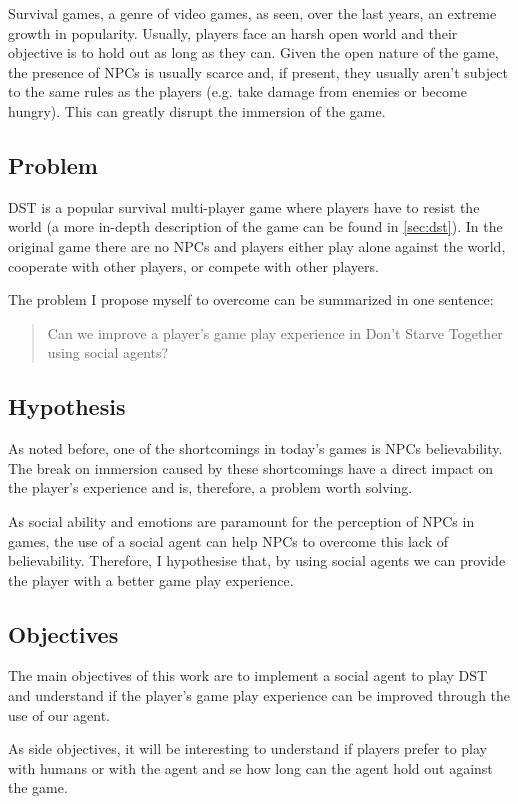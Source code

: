 Survival games, a genre of video games, as seen, over the last years, an extreme growth in popularity.
Usually, players face an harsh open world and their objective is to hold out as long as they can.
Given the open nature of the game, the presence of \ac{NPC}s is usually scarce and, if present, they usually aren't subject to the same rules as the players (e.g. take damage from enemies or become hungry).
This can greatly disrupt the immersion of the game.

\subsection{Problem}
\ac{DST} is a popular survival multi-player game where players have to resist the world (a more in-depth description of the game can be found in \ref{sec:dst}).
In the original game there are no \ac{NPC}s and players either play alone against the world, cooperate with other players, or compete with other players.

The problem I propose myself to overcome can be summarized in one sentence:
\begin{quotation}
Can we improve a player's game play experience in Don't Starve Together using social agents?
\end{quotation}

\subsection{Hypothesis}
As noted before, one of the shortcomings in today's games is \ac{NPC}s believability.
The break on immersion caused by these shortcomings have a direct impact on the player's experience and is, therefore, a problem worth solving.

As social ability and emotions are paramount for the perception of \ac{NPC}s in games, the use of a social agent can help \ac{NPC}s to overcome this lack of believability.
Therefore, I hypothesise that, by using social agents we can provide the player with a better game play experience.

\subsection{Objectives}
The main objectives of this work are to implement a social agent to play \ac{DST} and understand if the player's game play experience can be improved through the use of our agent.

As side objectives, it will be interesting to understand if players prefer to play with humans or with the agent and se how long can the agent hold out against the game.

